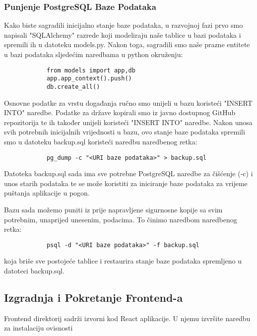 			\subsubsection{Punjenje PostgreSQL Baze Podataka}
			
			Kako biste sagradili inicijalno stanje baze podataka, u razvojnoj fazi prvo smo napisali "SQLAlchemy" razrede koji modeliraju naše tablice u bazi podataka i spremili ih u datoteku models.py. Nakon toga, sagradili smo naše prazne entitete u bazi podataka sljedećim naredbama u python okruženju:
			
			\begin{verbatim}
			from models import app,db
			app.app_context().push()
			db.create_all()
			\end{verbatim}
			
			Osnovne podatke za vrstu događanja ručno smo unijeli u bazu koristeći "INSERT INTO" naredbe. Podatke za države kopirali smo iz javno dostupnog GitHub repozitorija te ih također unijeli koristeći "INSERT INTO" naredbe. Nakon unosa svih potrebnih inicijalnih vrijednosti u bazu, ovo stanje baze podataka spremili smo u datoteku backup.sql koristeći naredbu naredbenog retka:
			
			\begin{verbatim}
			pg_dump -c "<URI baze podataka>" > backup.sql
			\end{verbatim}
			
			Datoteka backup.sql sada ima sve potrebne PostgreSQL naredbe za čišćenje (-c) i unos starih podataka te se može koristiti za iniciranje baze podataka za vrijeme puštanja aplikacije u pogon.
			
			Bazu sada možemo puniti iz prije napravljene sigurnosne kopije sa svim potrebnim, unaprijed unesenim, podacima. To činimo naredbom naredbenog retka:
			
			\begin{verbatim}
			psql -d "<URI baze podataka>" -f backup.sql
			\end{verbatim}
			
			koja briše sve postojeće tablice i restaurira stanje baze podataka spremljeno u datoteci backup.sql.
			
			\subsection{Izgradnja i Pokretanje Frontend-a}
			
			Frontend direktorij sadrži izvorni kod React aplikacije. U njemu izvršite naredbu za instalaciju ovisnosti 


